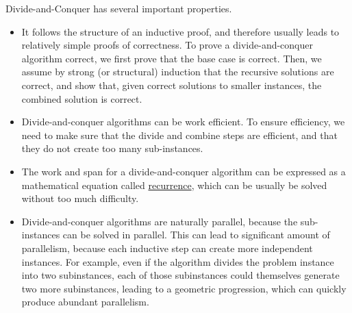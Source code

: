\begin{gram}
Divide-and-Conquer has several important properties.  
%

\begin{itemize}
\item  It follows the structure of an inductive proof, and therefore
usually leads to relatively simple proofs of correctness. 
%
To prove a divide-and-conquer algorithm correct, we first prove that the
base case is correct.  Then, we assume by strong (or structural)
induction that the recursive solutions are correct, and show that,
given correct solutions to smaller instances, the combined solution is
correct.
%

\item Divide-and-conquer algorithms can be work efficient.
%
To ensure efficiency, we need to make sure that the divide and combine
steps are efficient, and that they do not create too many
sub-instances.
%

\item The work and span for a divide-and-conquer algorithm can be
  expressed as a mathematical equation called \href{ch:analysis::recurrences}{recurrence},
which can be usually be solved without too much difficulty.
%

\item Divide-and-conquer algorithms are naturally parallel, because
  the sub-instances can be solved in parallel.  This can lead to
  significant amount of parallelism, because each inductive step can
  create more independent instances. For example, even if the
  algorithm divides the problem instance into two subinstances, each
  of those subinstances could themselves generate two more
  subinstances, leading to a geometric progression, which can quickly
  produce abundant parallelism.
\end{itemize}
\end{gram}


